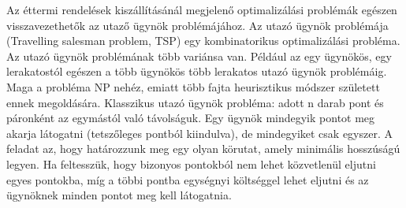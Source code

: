 
Az éttermi rendelések kiszállításánál megjelenő optimalizálási problémák egészen visszavezethetők az utaző ügynök problémájához. Az utazó ügynök problémája (Travelling salesman problem, TSP) egy kombinatorikus optimalizálási probléma. Az utazó ügynök problémának több variánsa van. Például az egy ügynökös, egy lerakatostól egészen a több ügynökös több lerakatos utazó ügynök problémáig. Maga a probléma NP nehéz, emiatt több fajta heurisztikus módszer született ennek megoldására. Klasszikus utazó ügynök probléma: adott n darab pont és páronként az egymástól való távolságuk. Egy ügynök mindegyik pontot meg akarja látogatni (tetszőleges pontból kiindulva), de mindegyiket csak egyszer. A feladat az, hogy határozzunk meg egy olyan körutat, amely minimális hosszúságú legyen. Ha feltesszük, hogy bizonyos pontokból nem lehet közvetlenül eljutni egyes pontokba, míg a többi pontba egységnyi költséggel lehet eljutni és az ügynöknek minden pontot meg kell látogatnia.
